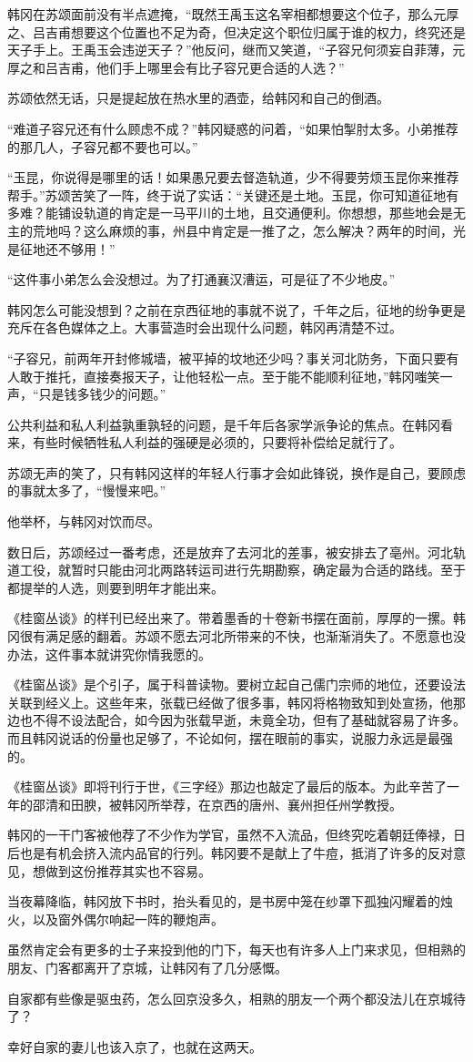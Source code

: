韩冈在苏颂面前没有半点遮掩，“既然王禹玉这名宰相都想要这个位子，那么元厚之、吕吉甫想要这个位置也不足为奇，但决定这个职位归属于谁的权力，终究还是天子手上。王禹玉会违逆天子？”他反问，继而又笑道，“子容兄何须妄自菲薄，元厚之和吕吉甫，他们手上哪里会有比子容兄更合适的人选？”

苏颂依然无话，只是提起放在热水里的酒壶，给韩冈和自己的倒酒。

“难道子容兄还有什么顾虑不成？”韩冈疑惑的问着，“如果怕掣肘太多。小弟推荐的那几人，子容兄都不要也可以。”

“玉昆，你说得是哪里的话！如果愚兄要去督造轨道，少不得要劳烦玉昆你来推荐帮手。”苏颂苦笑了一阵，终于说了实话：“关键还是土地。玉昆，你可知道征地有多难？能铺设轨道的肯定是一马平川的土地，且交通便利。你想想，那些地会是无主的荒地吗？这么麻烦的事，州县中肯定是一推了之，怎么解决？两年的时间，光是征地还不够用！”

“这件事小弟怎么会没想过。为了打通襄汉漕运，可是征了不少地皮。”

韩冈怎么可能没想到？之前在京西征地的事就不说了，千年之后，征地的纷争更是充斥在各色媒体之上。大事营造时会出现什么问题，韩冈再清楚不过。

“子容兄，前两年开封修城墙，被平掉的坟地还少吗？事关河北防务，下面只要有人敢于推托，直接奏报天子，让他轻松一点。至于能不能顺利征地，”韩冈嗤笑一声，“只是钱多钱少的问题。”

公共利益和私人利益孰重孰轻的问题，是千年后各家学派争论的焦点。在韩冈看来，有些时候牺牲私人利益的强硬是必须的，只要将补偿给足就行了。

苏颂无声的笑了，只有韩冈这样的年轻人行事才会如此锋锐，换作是自己，要顾虑的事就太多了，“慢慢来吧。”

他举杯，与韩冈对饮而尽。

数日后，苏颂经过一番考虑，还是放弃了去河北的差事，被安排去了亳州。河北轨道工役，就暂时只能由河北两路转运司进行先期勘察，确定最为合适的路线。至于都提举的人选，则要到明年才能出来。

《桂窗丛谈》的样刊已经出来了。带着墨香的十卷新书摆在面前，厚厚的一摞。韩冈很有满足感的翻着。苏颂不愿去河北所带来的不快，也渐渐消失了。不愿意也没办法，这件事本就讲究你情我愿的。

《桂窗丛谈》是个引子，属于科普读物。要树立起自己儒门宗师的地位，还要设法关联到经义上。这些年来，张载已经做了很多事，韩冈将格物致知到处宣扬，他那边也不得不设法配合，如今因为张载早逝，未竟全功，但有了基础就容易了许多。而且韩冈说话的份量也足够了，不论如何，摆在眼前的事实，说服力永远是最强的。

《桂窗丛谈》即将刊行于世，《三字经》那边也敲定了最后的版本。为此辛苦了一年的邵清和田腴，被韩冈所举荐，在京西的唐州、襄州担任州学教授。

韩冈的一干门客被他荐了不少作为学官，虽然不入流品，但终究吃着朝廷俸禄，日后也是有机会挤入流内品官的行列。韩冈要不是献上了牛痘，抵消了许多的反对意见，想做到这份推荐其实也不容易。

当夜幕降临，韩冈放下书时，抬头看见的，是书房中笼在纱罩下孤独闪耀着的烛火，以及窗外偶尔响起一阵的鞭炮声。

虽然肯定会有更多的士子来投到他的门下，每天也有许多人上门来求见，但相熟的朋友、门客都离开了京城，让韩冈有了几分感慨。

自家都有些像是驱虫药，怎么回京没多久，相熟的朋友一个两个都没法儿在京城待了？

幸好自家的妻儿也该入京了，也就在这两天。

